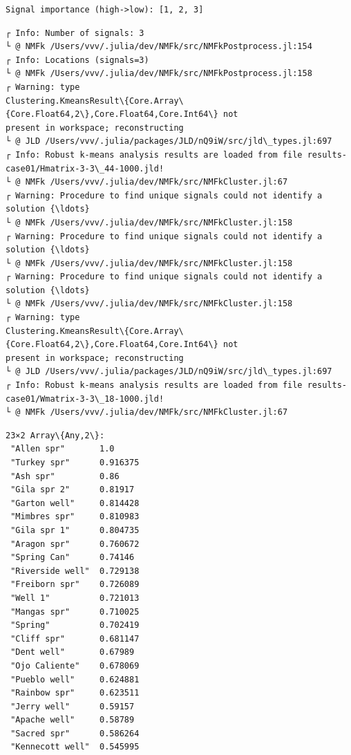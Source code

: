 \documentclass[11pt]{article}
\begin{document}
    \begin{Verbatim}[commandchars=\\\{\}]
Signal importance (high->low): [1, 2, 3]
    \end{Verbatim}

    \begin{Verbatim}[commandchars=\\\{\}]
┌ Info: Number of signals: 3
└ @ NMFk /Users/vvv/.julia/dev/NMFk/src/NMFkPostprocess.jl:154
┌ Info: Locations (signals=3)
└ @ NMFk /Users/vvv/.julia/dev/NMFk/src/NMFkPostprocess.jl:158
┌ Warning: type
Clustering.KmeansResult\{Core.Array\{Core.Float64,2\},Core.Float64,Core.Int64\} not
present in workspace; reconstructing
└ @ JLD /Users/vvv/.julia/packages/JLD/nQ9iW/src/jld\_types.jl:697
┌ Info: Robust k-means analysis results are loaded from file results-
case01/Hmatrix-3-3\_44-1000.jld!
└ @ NMFk /Users/vvv/.julia/dev/NMFk/src/NMFkCluster.jl:67
┌ Warning: Procedure to find unique signals could not identify a solution {\ldots}
└ @ NMFk /Users/vvv/.julia/dev/NMFk/src/NMFkCluster.jl:158
┌ Warning: Procedure to find unique signals could not identify a solution {\ldots}
└ @ NMFk /Users/vvv/.julia/dev/NMFk/src/NMFkCluster.jl:158
┌ Warning: Procedure to find unique signals could not identify a solution {\ldots}
└ @ NMFk /Users/vvv/.julia/dev/NMFk/src/NMFkCluster.jl:158
┌ Warning: type
Clustering.KmeansResult\{Core.Array\{Core.Float64,2\},Core.Float64,Core.Int64\} not
present in workspace; reconstructing
└ @ JLD /Users/vvv/.julia/packages/JLD/nQ9iW/src/jld\_types.jl:697
┌ Info: Robust k-means analysis results are loaded from file results-
case01/Wmatrix-3-3\_18-1000.jld!
└ @ NMFk /Users/vvv/.julia/dev/NMFk/src/NMFkCluster.jl:67
    \end{Verbatim}

    
    \begin{Verbatim}[commandchars=\\\{\}]
23×2 Array\{Any,2\}:
 "Allen spr"       1.0
 "Turkey spr"      0.916375
 "Ash spr"         0.86
 "Gila spr 2"      0.81917
 "Garton well"     0.814428
 "Mimbres spr"     0.810983
 "Gila spr 1"      0.804735
 "Aragon spr"      0.760672
 "Spring Can"      0.74146
 "Riverside well"  0.729138
 "Freiborn spr"    0.726089
 "Well 1"          0.721013
 "Mangas spr"      0.710025
 "Spring"          0.702419
 "Cliff spr"       0.681147
 "Dent well"       0.67989
 "Ojo Caliente"    0.678069
 "Pueblo well"     0.624881
 "Rainbow spr"     0.623511
 "Jerry well"      0.59157
 "Apache well"     0.58789
 "Sacred spr"      0.586264
 "Kennecott well"  0.545995
    \end{Verbatim}
\end{document}
